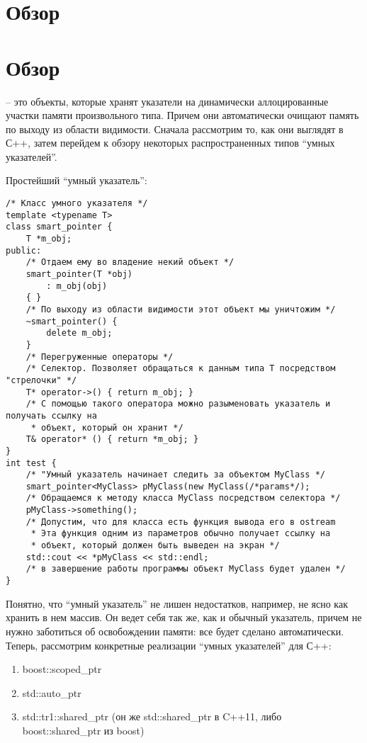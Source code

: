 \section{Обзор}\section{Обзор}

 -- это объекты, которые хранят указатели на динамически аллоцированные участки памяти произвольного типа. Причем они автоматически очищают память по выходу из области видимости.
Сначала рассмотрим то, как они выглядят в С++, затем перейдем к обзору некоторых распространенных типов ``умных указателей''.

Простейший ``умный указатель'':
\begin{lstlisting}
/* Класс умного указателя */
template <typename T>
class smart_pointer {
    T *m_obj;
public:
    /* Отдаем ему во владение некий объект */
    smart_pointer(T *obj)
        : m_obj(obj)
    { }
    /* По выходу из области видимости этот объект мы уничтожим */
    ~smart_pointer() {
        delete m_obj;
    }
    /* Перегруженные операторы */
    /* Селектор. Позволяет обращаться к данным типа T посредством "стрелочки" */
    T* operator->() { return m_obj; }
    /* С помощью такого оператора можно разыменовать указатель и получать ссылку на
     * объект, который он хранит */
    T& operator* () { return *m_obj; }
}
int test {
    /* "Умный указатель начинает следить за объектом MyClass */
    smart_pointer<MyClass> pMyClass(new MyClass(/*params*/);    
    /* Обращаемся к методу класса MyClass посредством селектора */
    pMyClass->something();    
    /* Допустим, что для класса есть функция вывода его в ostream
     * Эта функция одним из параметров обычно получает ссылку на 
     * объект, который должен быть выведен на экран */
    std::cout << *pMyClass << std::endl;    
    /* в завершение работы программы объект MyClass будет удален */
}

\end{lstlisting}

Понятно, что ``умный указатель'' не лишен недостатков, например, не ясно как хранить в нем массив. Он ведет себя так же, как и обычный указатель, причем не нужно заботиться об освобождении памяти: все будет сделано автоматически.
Теперь, рассмотрим конкретные реализации ``умных указателей'' для С++:

\begin{enumerate}
\item boost::scoped_ptr
\item std::auto_ptr
\item std::tr1::shared_ptr (он же std::shared_ptr в C++11, либо boost::shared_ptr из boost)
\end {enumerate}

